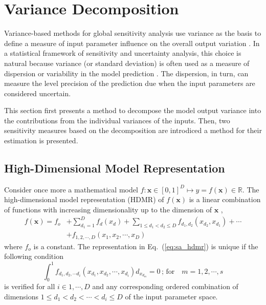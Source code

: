 \section{Variance Decomposition}\label{sec:sa_variance_decomposition}

Variance-based methods for global sensitivity analysis use variance as the basis to define a measure of input parameter influence on the overall output variation \cite{Cacuci2004}.
In a statistical framework of sensitivity and uncertainty analysis, 
this choice is natural because variance (or standard deviation) is often used as a measure of dispersion or variability in the model prediction \cite{Saltelli2008}.
The  dispersion, in turn, can measure the level precision of the prediction due when the input parameters are considered uncertain.

This section first presents a method to decompose the model output variance into the contributions from the individual variances of the inputs.
Then, two sensitivity measures based on the decomposition are introdiced a method for their estimation is presented.

\subsection{High-Dimensional Model Representation}\label{sub:sa_hdmr}

Consider once more a mathematical model $f: \bm{x} \in [0,1]^D \mapsto y = f(\bm{x}) \in \mathbb{R}$.
The high-dimensional model representation (HDMR) of $f(\bm{x})$ is a linear combination of functions with increasing dimensionality up to the dimension of $\bm{x}$ \cite{Li2001},
\begin{equation}
	\begin{split}
		f(\bm{x}) = f_o & + \sum_{d_1 = 1}^{D} f_d(x_d) + \sum_{1 \leq d_1 < d_2 \leq D} f_{d_1,d_2} (x_{d_2}, x_{d_1}) + \cdots  \\
	                      & + f_{1,2,\cdots,D} (x_1, x_2, \cdots, x_D)
	\end{split}
\label{eq:sa_hdmr}
\end{equation}
where $f_o$ is a constant.
The representation in Eq.~(\ref{eq:sa_hdmr}) is unique if the following condition \cite{Sobol2001}
\begin{equation}
    \int_{0}^{1} f_{d_1, d_2, \cdots d_i}(x_{d_1}, x_{d_2}, \cdots, x_{d_i}) d_{x_{d_m}} = 0 \,;
		\, \text{for}\quad m = 1,2,\cdots,s
\label{eq:sa_unicity}
\end{equation}
is verified for all $i \in {1, \cdots, D}$ and 
any corresponding ordered combination of dimensions $1 \leq d_1 < d_2 < \cdots < d_i \leq D$ of the input parameter space.

